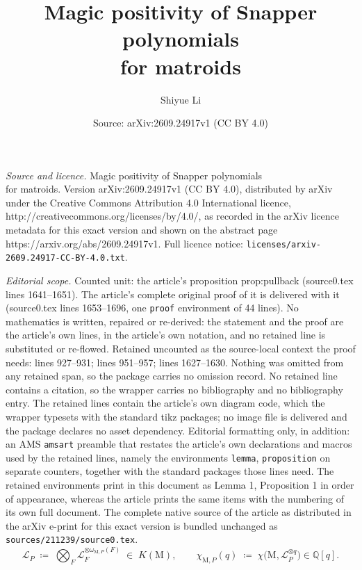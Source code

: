 \documentclass[10pt,a4paper]{amsart}
\title{Magic positivity of Snapper polynomials \\ for matroids}
\author{Shiyue Li}
\date{Source: arXiv:2609.24917v1 (CC BY 4.0)}
\newcommand{\M}{\mathrm{M}}
\def\Q{\mathbb{Q}}
\newcommand{\cL}{\mathcal{L}}
\begin{document}
\maketitle

\noindent\emph{Source and licence.} Magic positivity of Snapper polynomials \\ for matroids. Version arXiv:2609.24917v1 (CC BY 4.0), distributed by arXiv under the Creative Commons Attribution 4.0 International licence, http://creativecommons.org/licenses/by/4.0/, as recorded in the arXiv licence metadata for this exact version and shown on the abstract page https://arxiv.org/abs/2609.24917v1. Full licence notice: \texttt{licenses/arxiv-2609.24917-CC-BY-4.0.txt}.\par\smallskip

\noindent\textit{Editorial scope.} Counted unit: the article's proposition prop:pullback (source0.tex lines 1641--1651). The article's complete original proof of it is delivered with it (source0.tex lines 1653--1696, one \texttt{proof} environment of 44 lines). No mathematics is written, repaired or re-derived: the statement and the proof are the article's own lines, in the article's own notation, and no retained line is substituted or re-flowed.  Retained uncounted as the source-local context the proof needs: lines 927--931; lines 951--957; lines 1627--1630.  Nothing was omitted from any retained span, so the package carries no omission record.  No retained line contains a citation, so the wrapper carries no bibliography and no bibliography entry.  The retained lines contain the article's own diagram code, which the wrapper typesets with the standard tikz packages; no image file is delivered and the package declares no asset dependency.  Editorial formatting only, in addition: an AMS \texttt{amsart} preamble that restates the article's own declarations and macros used by the retained lines, namely the environments \texttt{lemma}, \texttt{proposition} on separate counters, together with the standard packages those lines need.  The retained environments print in this document as Lemma 1, Proposition 1 in order of appearance, whereas the article prints the same items with the numbering of its own full document.  The complete native source of the article as distributed in the arXiv e-print for this exact version is bundled unchanged as \texttt{sources/211239/source0.tex}.
\begin{equation}\label{eq:LP-flats}
  \cL_P \;\coloneqq\; \bigotimes_{F} \cL_F^{\otimes \omega_{\M, P}(F)} \;\in\; K(\M),
  \qquad
  \chi_{\M,P}(q) \;\coloneqq\; \chi\big(\M, \cL_P^{\otimes q}\big) \in \Q[q].
\end{equation}
\end{document}
